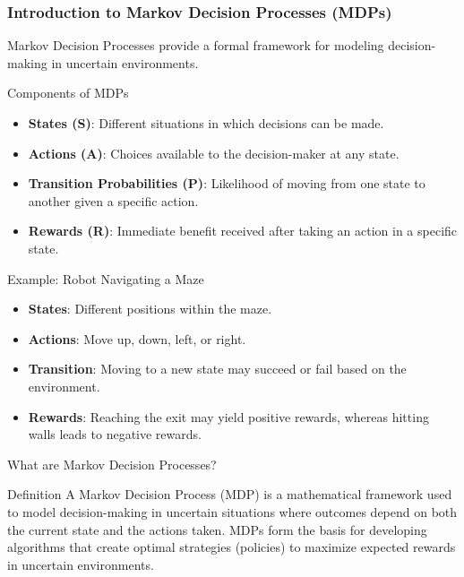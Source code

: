 \documentclass[aspectratio=169]{beamer}
\begin{document}
\begin{frame}[fragile]
    \frametitle{Introduction to Markov Decision Processes (MDPs)}
    
    Markov Decision Processes provide a formal framework for modeling decision-making in uncertain environments.

    \begin{block}{Components of MDPs}
        \begin{itemize}
            \item \textbf{States (S)}: Different situations in which decisions can be made.
            \item \textbf{Actions (A)}: Choices available to the decision-maker at any state.
            \item \textbf{Transition Probabilities (P)}: Likelihood of moving from one state to another given a specific action.
            \item \textbf{Rewards (R)}: Immediate benefit received after taking an action in a specific state.
        \end{itemize}
    \end{block}

    \begin{block}{Example: Robot Navigating a Maze}
        \begin{itemize}
            \item \textbf{States}: Different positions within the maze.
            \item \textbf{Actions}: Move up, down, left, or right.
            \item \textbf{Transition}: Moving to a new state may succeed or fail based on the environment.
            \item \textbf{Rewards}: Reaching the exit may yield positive rewards, whereas hitting walls leads to negative rewards.
        \end{itemize}
    \end{block}
\end{frame}

\begin{frame}[fragile]{What are Markov Decision Processes?}
    \begin{block}{Definition}
        A Markov Decision Process (MDP) is a mathematical framework used to model decision-making in uncertain situations where outcomes depend on both the current state and the actions taken. MDPs form the basis for developing algorithms that create optimal strategies (policies) to maximize expected rewards in uncertain environments.
    \end{block}
\end{frame}
\end{document}
